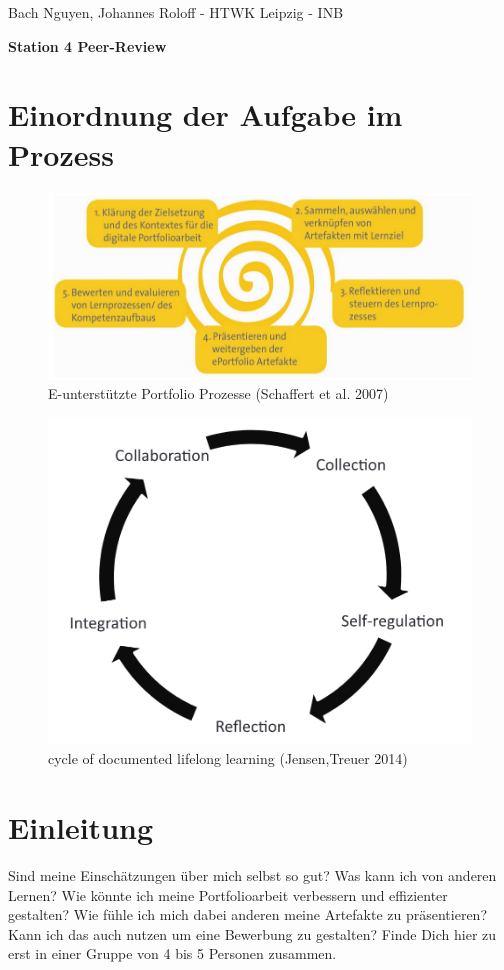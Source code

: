 \documentclass[a4paper,oneside]{scrarticle}
\begin{document}
	\begin{flushleft}
		Bach Nguyen, Johannes Roloff - HTWK Leipzig - INB
	\end{flushleft}
	\begin{center}
		\begin{LARGE}
			\textbf{Station 4 Peer-Review}
		\end{LARGE}
	\end{center}
	\section*{Einordnung der Aufgabe im Prozess}
	\begin{figure} [h]
		\centering
		\includegraphics[width=0.7\linewidth]{e-portfolio-prozesse-schaffert}
		\caption{E-unterstützte Portfolio Prozesse (Schaffert et al. 2007)}
		\label{fig:e-portfolio-prozesse-schaffert}
	\end{figure}
	\begin{figure}[h]
		\centering
		\includegraphics[width=0.7\linewidth]{cycle-of-documented-lifelong-learning-Jensen}
		\caption{cycle of documented lifelong learning (Jensen,Treuer 2014)}
		\label{fig:cycle-of-documented-lifelong-learning-jensen}
	\end{figure}
	\pagebreak 
	
	\section*{Einleitung}
	Sind meine Einschätzungen über mich selbst so gut? Was kann ich von anderen Lernen? Wie könnte ich meine Portfolioarbeit verbessern und effizienter gestalten? Wie fühle ich mich dabei anderen meine Artefakte zu präsentieren? Kann ich das auch nutzen um eine Bewerbung zu gestalten? Finde Dich hier zu erst in einer Gruppe von 4 bis 5 Personen zusammen.
	
\end{document}
